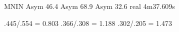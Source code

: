 \documentclass[a4paper,final,notitlepage,11pt,svgnames]{scrartcl}
\begin{document}
MNIN
Asym 46.4%
Asym 68.9%
Asym 32.6%
real    4m37.609s


.445/.554 = 0.803
.366/.308 = 1.188
.302/.205 = 1.473



\end{document}
